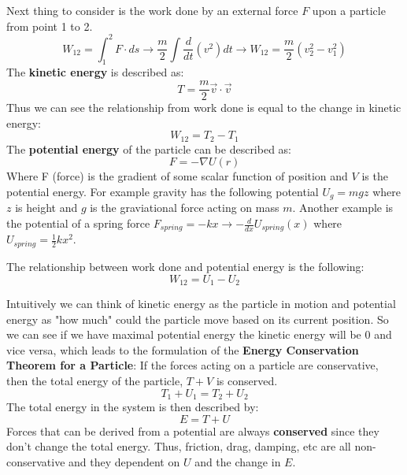 \documentclass{article}
\begin{document}
Next thing to consider is the work done by an external force $F$ upon a particle from point 1 to 2.
\begin{equation}
    W_{12} = \int_{1}^{2} F \cdot ds \to \frac{m}{2} \int \frac{d}{dt}(v^2)dt \to W_{12} = \frac{m}{2}(v_2^2 - v_1^2)
\end{equation}
The \textbf{kinetic energy} is described as:
\begin{equation}
    T = \frac{m}{2}\vec{v}\cdot\vec{v}
\end{equation}
Thus we can see the relationship from work done is equal to the change in kinetic energy:
\begin{equation}
    W_{12} = T_2 - T_1
\end{equation}
The \textbf{potential energy} of the particle can be described as:
\begin{equation}
    F = -\nabla U(r)
\end{equation}
Where F (force) is the gradient of some scalar function of position and $V$ is the potential energy. For example gravity has the following potential $U_{g} = m g z$ where $z$ is height and $g$ is the graviational force acting on mass $m$. Another example is the potential of a spring force $F_{spring} = -k x \to -\frac{d}{dx}U_{spring}(x)$ where $U_{spring} = \frac{1}{2} k x^2$.

The relationship between work done and potential energy is the following:
\begin{equation}
    W_{12} = U_1 - U_2
\end{equation}

Intuitively we can think of kinetic energy as the particle in motion and potential energy as "how much" could the particle move based on its current position. So we can see if we have maximal potential energy the kinetic energy will be 0 and vice versa, which leads to the formulation of the \textbf{Energy Conservation Theorem for a Particle}: If the forces acting on a particle are conservative, then the total energy of the particle, $T + V$ is conserved.
\begin{equation}
    T_1 + U_1 = T_2 + U_2
\end{equation}
The total energy in the system is then described by:
\begin{equation}
    E = T + U
\end{equation}
 Forces that can be derived from a potential are always \textbf{conserved} since they don't change the total energy. Thus, friction, drag, damping, etc are all non-conservative and they dependent on $U$ and the change in $E$.
\end{document}

